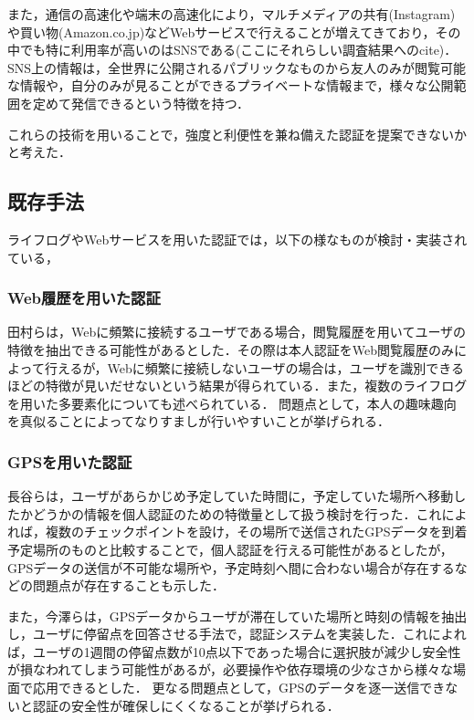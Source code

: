 また，通信の高速化や端末の高速化により，マルチメディアの共有(Instagram)や買い物(Amazon.co.jp)などWebサービスで行えることが増えてきており，その中でも特に利用率が高いのはSNSである(ここにそれらしい調査結果へのcite)．
SNS上の情報は，全世界に公開されるパブリックなものから友人のみが閲覧可能な情報や，自分のみが見ることができるプライベートな情報まで，様々な公開範囲を定めて発信できるという特徴を持つ．

これらの技術を用いることで，強度と利便性を兼ね備えた認証を提案できないかと考えた．

\subsection{既存手法}\label{sec:lifeLogAuth}
ライフログやWebサービスを用いた認証では，以下の様なものが検討・実装されている，

\subsubsection{Web履歴を用いた認証}\label{subsec:webHistoryAuth}
田村ら\cite{田村健範:2011-07-14}は，Webに頻繁に接続するユーザである場合，閲覧履歴を用いてユーザの特徴を抽出できる可能性があるとした．その際は本人認証をWeb閲覧履歴のみによって行えるが，Webに頻繁に接続しないユーザの場合は，ユーザを識別できるほどの特徴が見いだせないという結果が得られている．また，複数のライフログを用いた多要素化についても述べられている．
問題点として，本人の趣味趣向を真似ることによってなりすましが行いやすいことが挙げられる．

\subsubsection{GPSを用いた認証}\label{subsec:gpsAuth}
長谷ら\cite{長谷容子:2004-08-20}は，ユーザがあらかじめ予定していた時間に，予定していた場所へ移動したかどうかの情報を個人認証のための特徴量として扱う検討を行った．これによれば，複数のチェックポイントを設け，その場所で送信されたGPSデータを到着予定場所のものと比較することで，個人認証を行える可能性があるとしたが，GPSデータの送信が不可能な場所や，予定時刻へ間に合わない場合が存在するなどの問題点が存在することも示した．

また，今澤ら\cite{imazawa:2008-10-08}は，GPSデータからユーザが滞在していた場所と時刻の情報を抽出し，ユーザに停留点を回答させる手法で，認証システムを実装した．これによれば，ユーザの1週間の停留点数が10点以下であった場合に選択肢が減少し安全性が損なわれてしまう可能性があるが，必要操作や依存環境の少なさから様々な場面で応用できるとした．
更なる問題点として，GPSのデータを逐一送信できないと認証の安全性が確保しにくくなることが挙げられる．

